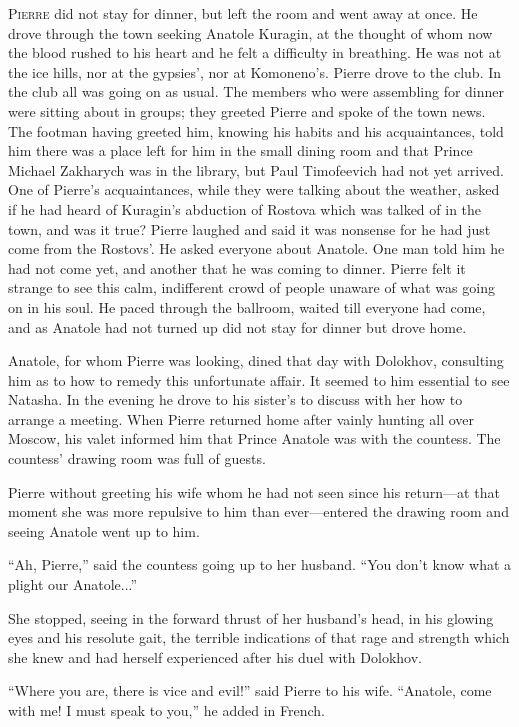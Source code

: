 \lettrine[lines=2, loversize=0.3, lraise=0]{\initfamily P}{ierre}
did not stay for dinner, but left the room and went away
at once.  He drove through the town seeking Anatole Kuragin, at
the thought of whom now the blood rushed to his heart and he felt
a difficulty in breathing. He was not at the ice hills, nor at
the gypsies', nor at Komoneno's. Pierre drove to the club. In the
club all was going on as usual. The members who were assembling
for dinner were sitting about in groups; they greeted Pierre and
spoke of the town news. The footman having greeted him, knowing
his habits and his acquaintances, told him there was a place left
for him in the small dining room and that Prince Michael
Zakharych was in the library, but Paul Timofeevich had not yet
arrived. One of Pierre's acquaintances, while they were talking
about the weather, asked if he had heard of Kuragin's abduction
of Rostova which was talked of in the town, and was it true?
Pierre laughed and said it was nonsense for he had just come from
the Rostovs'. He asked everyone about Anatole. One man told him
he had not come yet, and another that he was coming to
dinner. Pierre felt it strange to see this calm, indifferent
crowd of people unaware of what was going on in his soul. He
paced through the ballroom, waited till everyone had come, and as
Anatole had not turned up did not stay for dinner but drove home.

Anatole, for whom Pierre was looking, dined that day with
Dolokhov, consulting him as to how to remedy this unfortunate
affair. It seemed to him essential to see Natasha. In the evening
he drove to his sister's to discuss with her how to arrange a
meeting. When Pierre returned home after vainly hunting all over
Moscow, his valet informed him that Prince Anatole was with the
countess. The countess' drawing room was full of guests.

Pierre without greeting his wife whom he had not seen since his
return---at that moment she was more repulsive to him than
ever---entered the drawing room and seeing Anatole went up to
him.

``Ah, Pierre,'' said the countess going up to her husband. ``You
don't know what a plight our Anatole...''

She stopped, seeing in the forward thrust of her husband's head,
in his glowing eyes and his resolute gait, the terrible
indications of that rage and strength which she knew and had
herself experienced after his duel with Dolokhov.

``Where you are, there is vice and evil!'' said Pierre to his
wife.  ``Anatole, come with me! I must speak to you,'' he added
in French.


